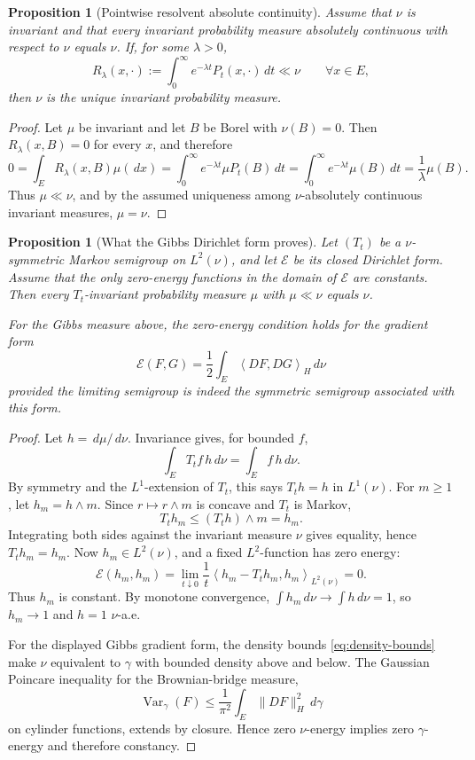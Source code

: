 \documentclass[12pt]{article}
\newcommand{\1}{\mathbf 1}
\newcommand{\dd}{\,d}
\newcommand{\ip}[2]{\left\langle #1,#2\right\rangle}
\theoremstyle{plain}
\newtheorem{proposition}[theorem]{Proposition}
\theoremstyle{definition}
\theoremstyle{remark}
\numberwithin{equation}{section}
\begin{document}
\begin{proposition}[Pointwise resolvent absolute continuity]\label{prop:resolvent}
Assume that \(\nu\) is invariant and that every invariant probability measure
absolutely continuous with respect to \(\nu\) equals \(\nu\).  If, for some
\(\lambda>0\),
\[
R_\lambda(x,\cdot)
:=
\int_0^\infty e^{-\lambda t}P_t(x,\cdot)\dd t
\ll\nu
\qquad\forall x\in E,
\]
then \(\nu\) is the unique invariant probability measure.
\end{proposition}

\begin{proof}
Let \(\mu\) be invariant and let \(B\) be Borel with \(\nu(B)=0\).  Then
\(R_\lambda(x,B)=0\) for every \(x\), and therefore
\[
0
=
\int_ER_\lambda(x,B)\mu(\dd x)
=
\int_0^\infty e^{-\lambda t}\mu P_t(B)\dd t
=
\int_0^\infty e^{-\lambda t}\mu(B)\dd t
=
\frac1\lambda\mu(B).
\]
Thus \(\mu\ll\nu\), and by the assumed uniqueness among \(\nu\)-absolutely
continuous invariant measures, \(\mu=\nu\).
\end{proof}

\begin{proposition}[What the Gibbs Dirichlet form proves]\label{prop:acunique}
Let \((T_t)\) be a \(\nu\)-symmetric Markov semigroup on \(L^2(\nu)\), and let
\(\mathcal E\) be its closed Dirichlet form.  Assume that the only
zero-energy functions in the domain of \(\mathcal E\) are constants.  Then every
\(T_t\)-invariant probability measure \(\mu\) with \(\mu\ll\nu\) equals \(\nu\).

For the Gibbs measure above, the zero-energy condition holds for the gradient
form
\[
\mathcal E(F,G)=\frac12\int_E\ip{DF}{DG}_H\dd\nu
\]
provided the limiting semigroup is indeed the symmetric semigroup associated
with this form.
\end{proposition}

\begin{proof}
Let \(h=\dd\mu/\dd\nu\).  Invariance gives, for bounded \(f\),
\[
\int_ET_tf\,h\dd\nu=\int_Ef\,h\dd\nu.
\]
By symmetry and the \(L^1\)-extension of \(T_t\), this says \(T_th=h\) in
\(L^1(\nu)\).  For \(m\ge1\), let \(h_m=h\wedge m\).  Since
\(r\mapsto r\wedge m\) is concave and \(T_t\) is Markov,
\[
T_th_m\le (T_th)\wedge m=h_m.
\]
Integrating both sides against the invariant measure \(\nu\) gives equality,
hence \(T_th_m=h_m\).  Now \(h_m\in L^2(\nu)\), and a fixed \(L^2\)-function has
zero energy:
\[
\mathcal E(h_m,h_m)
=
\lim_{t\downarrow0}\frac1t\ip{h_m-T_th_m}{h_m}_{L^2(\nu)}
=0.
\]
Thus \(h_m\) is constant.  By monotone convergence,
\(\int h_m\dd\nu\to\int h\dd\nu=1\), so \(h_m\to1\) and \(h=1\) \(\nu\)-a.e.

For the displayed Gibbs gradient form, the density bounds \eqref{eq:density-bounds}
make \(\nu\) equivalent to \(\gamma\) with bounded density above and below.
The Gaussian Poincare inequality for the Brownian-bridge measure,
\[
\operatorname{Var}_\gamma(F)
\le
\frac1{\pi^2}\int_E\|DF\|_H^2\dd\gamma
\]
on cylinder functions, extends by closure.  Hence zero \(\nu\)-energy implies
zero \(\gamma\)-energy and therefore constancy.
\end{proof}
\end{document}
